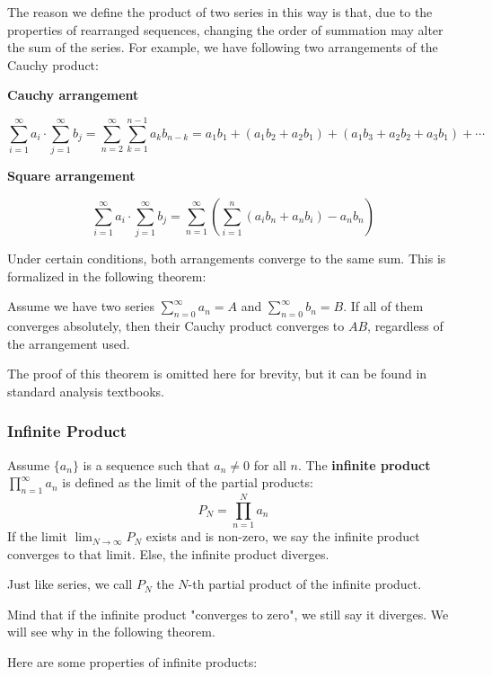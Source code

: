 \documentclass[oneside]{book}
\begin{document}
The reason we define the product of two series in this way is that, due to the properties of rearranged sequences, changing the order of summation may alter the sum of the series. For example, we have following two arrangements of the Cauchy product:

\textbf{Cauchy arrangement}

\[
\sum_{i=1}^{\infty} a_i \cdot \sum_{j=1}^{\infty} b_j = \sum_{n=2}^{\infty} \sum_{k=1}^{n-1} a_k b_{n-k} = a_1 b_1 + (a_1 b_2 + a_2 b_1) + (a_1 b_3 + a_2 b_2 + a_3 b_1) + \cdots
\]

\textbf{Square arrangement}

\[
\sum_{i=1}^{\infty} a_i \cdot \sum_{j=1}^{\infty} b_j = \sum_{n=1}^{\infty} \left(\sum_{i=1}^{n}(a_i b_n+ a_n b_i) - a_n b_n \right)
\]

Under certain conditions, both arrangements converge to the same sum. This is formalized in the following theorem:

\begin{theorem}
    Assume we have two series $\sum_{n=0}^{\infty} a_n = A$ and $\sum_{n=0}^{\infty} b_n = B$. If all of them converges absolutely, then their Cauchy product converges to $AB$, regardless of the arrangement used.
\end{theorem}

The proof of this theorem is omitted here for brevity, but it can be found in standard analysis textbooks.

\subsubsection{Infinite Product}
\begin{definition}
    Assume $\{a_n\}$ is a sequence such that $a_n \neq 0$ for all $n$. The \textbf{infinite product} $\prod_{n=1}^{\infty} a_n$ is defined as the limit of the partial products:
    \[ P_N = \prod_{n=1}^{N} a_n \]
    If the limit $\lim_{N \to \infty} P_N$ exists and is non-zero, we say the infinite product converges to that limit.
    Else, the infinite product diverges.
\end{definition}

Just like series, we call $P_N$ the $N$-th partial product of the infinite product.

Mind that if the infinite product "converges to zero", we still say it diverges. We will see why in the following theorem.

Here are some properties of infinite products:
\end{document}
